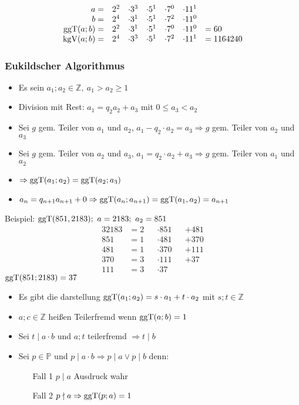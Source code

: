 $$\begin{array}{rcccccl}
      a =         & 2^2 & \cdot 3^3 & \cdot 5^1 & \cdot 7^0 & \cdot 11^1             \\
      b =         & 2^4 & \cdot 3^1 & \cdot 5^1 & \cdot 7^2 & \cdot 11^0             \\
      \operatorname{ggT}(a;b) = & 2^2 & \cdot 3^1 & \cdot 5^1 & \cdot 7^0 & \cdot 11^0 & = 60      \\
      \operatorname{kgV}(a;b) = & 2^4 & \cdot 3^3 & \cdot 5^1 & \cdot 7^2 & \cdot 11^1 & = 1164240
\end{array}$$
\subsubsection{Eukildscher Algorithmus}
\begin{itemize}
    \item Es sein $a_1;a_2 \in \mathbb{Z},\ a_1 > a_2 \geq 1$
    \item Division mit Rest: $a_1 = q_2 a_2 + a_3$ mit $0 \leq a_3 < a_2$
    \item Sei $g$ gem. Teiler von $a_1$ und $a_2$, $a_1 - q_2 \cdot a_2 = a_3 \Rightarrow g$ gem. Teiler von $a_2$ und $a_3$
    \item Sei $g$ gem. Teiler von $a_2$ und $a_3$, $a_1 = q_2 \cdot a_2 + a_3 \Rightarrow g$ gem. Teiler von $a_1$ und $a_2$
    \item $\Rightarrow \operatorname{ggT}(a_1;a_2) = \operatorname{ggT}(a_2;a_3)$
    \item $a_{n}=q_{n+1}a_{n+1} + 0 \Rightarrow \operatorname{ggT}(a_n;a_{n+1}) = \operatorname{ggT}(a_1,a_2) = a_{n+1}$
\end{itemize}
Beispiel: $\operatorname{ggT}(851,2183);\ a=2183;\ a_2 = 851$
\begin{alignat*}{3}
    2183 & = 2 &  & \cdot 851 &  & + 481 \\
    851  & = 1 &  & \cdot 481 &  & + 370 \\
    481  & = 1 &  & \cdot 370 &  & + 111 \\
    370  & = 3 &  & \cdot 111 &  & + 37  \\
    111  & = 3 &  & \cdot 37
\end{alignat*}
$\operatorname{ggT}(851;2183) = 37$
\begin{itemize}
    \item Es gibt die darstellung $\operatorname{ggT}(a_1;a_2) = s\cdot a_1 + t \cdot a_2$ mit $s;t \in \mathbb{Z}$
    \item $a;c \in \mathbb{Z}$ heißen Teilerfremd wenn $\operatorname{ggT}(a;b) = 1$
    \item Sei $t \mid a \cdot b$ und $a;t$ teilerfremd $\Rightarrow t \mid b$
    \item Sei $p \in \mathbb{P}$ und $p \mid a \cdot b \Rightarrow p \mid a \vee p \mid b$ denn:
    \begin{itemize}
        \item[Fall 1] $p \mid a$ Ausdruck wahr
        \item[Fall 2] $p \nmid a \Rightarrow \operatorname{ggT}(p;a) = 1$
    \end{itemize}
\end{itemize}

